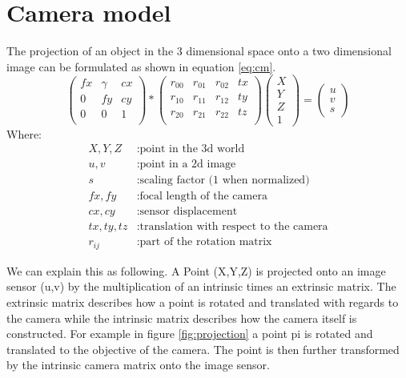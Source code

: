 \documentclass[11pt,a4paper,titlepage,oneside]{report}
\begin{document}
\section{Camera model}
The projection of an object in the 3 dimensional space onto a two dimensional image can be formulated as shown in equation \ref{eq:cm}.
\begin{equation}\label{eq:cm}
  \begin{pmatrix}fx & \gamma & cx \\
      0 & fy & cy \\
      0 & 0 & 1 \\
    \end{pmatrix}*
    \begin{pmatrix}
      r_{00} & r_{01} & r_{02} & tx \\
      r_{10} & r_{11} & r_{12} & ty \\
      r_{20} & r_{21} & r_{22} & tz \\
    \end{pmatrix}
    \begin{pmatrix}
      X \\
      Y \\
      Z \\
      1
    \end{pmatrix}=
    \begin{pmatrix}
      u \\
      v \\
      s
  \end{pmatrix}
\end{equation}
Where:
\begin{align*}
  X,Y,Z		&: \text{point in the 3d world}\\
  u,v	    	&: \text{point in a 2d image}\\
  s		&: \text{scaling factor (1 when normalized)}\\
  fx,fy   	&: \text{focal length of the camera}\\
  cx,cy   	&: \text{sensor displacement}\\
  tx,ty,tz	&: \text{translation with respect to the camera}\\
  r_{ij}	&: \text{part of the rotation matrix}
\end{align*}

We can explain this as following. A Point (X,Y,Z) is projected onto an image sensor (u,v) by the multiplication of an intrinsic times an extrinsic matrix. The extrinsic matrix describes how a point is rotated and translated with regards to the camera while the intrinsic matrix describes how the camera itself is constructed. For example in figure \ref{fig:projection} a point pi is rotated and translated to the objective of the camera. The point is then further transformed by the intrinsic camera matrix onto the image sensor.
\end{document}
